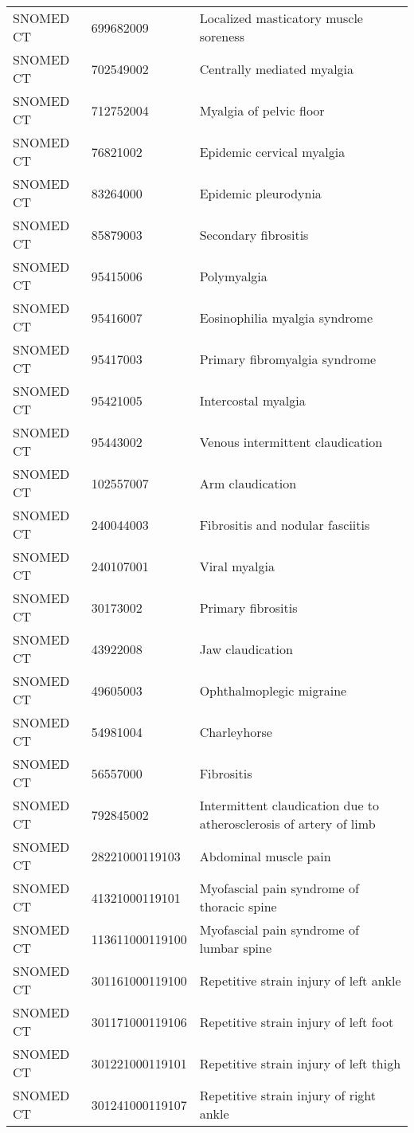 \begin{longtable}{p{}p{}p{}}
  SNOMED CT & 699682009 & Localized masticatory muscle soreness \\ 
  SNOMED CT & 702549002 & Centrally mediated myalgia \\ 
  SNOMED CT & 712752004 & Myalgia of pelvic floor \\ 
  SNOMED CT & 76821002 & Epidemic cervical myalgia \\ 
  SNOMED CT & 83264000 & Epidemic pleurodynia \\ 
  SNOMED CT & 85879003 & Secondary fibrositis \\ 
  SNOMED CT & 95415006 & Polymyalgia \\ 
  SNOMED CT & 95416007 & Eosinophilia myalgia syndrome \\ 
  SNOMED CT & 95417003 & Primary fibromyalgia syndrome \\ 
  SNOMED CT & 95421005 & Intercostal myalgia \\ 
  SNOMED CT & 95443002 & Venous intermittent claudication \\ 
  SNOMED CT & 102557007 & Arm claudication \\ 
  SNOMED CT & 240044003 & Fibrositis and nodular fasciitis \\ 
  SNOMED CT & 240107001 & Viral myalgia \\ 
  SNOMED CT & 30173002 & Primary fibrositis \\ 
  SNOMED CT & 43922008 & Jaw claudication \\ 
  SNOMED CT & 49605003 & Ophthalmoplegic migraine \\ 
  SNOMED CT & 54981004 & Charleyhorse \\ 
  SNOMED CT & 56557000 & Fibrositis \\ 
  SNOMED CT & 792845002 & Intermittent claudication due to atherosclerosis of artery of limb \\ 
  SNOMED CT & 28221000119103 & Abdominal muscle pain \\ 
  SNOMED CT & 41321000119101 & Myofascial pain syndrome of thoracic spine \\ 
  SNOMED CT & 113611000119100 & Myofascial pain syndrome of lumbar spine \\ 
  SNOMED CT & 301161000119100 & Repetitive strain injury of left ankle \\ 
  SNOMED CT & 301171000119106 & Repetitive strain injury of left foot \\ 
  SNOMED CT & 301221000119101 & Repetitive strain injury of left thigh \\ 
  SNOMED CT & 301241000119107 & Repetitive strain injury of right ankle \\ 

\end{longtable}
